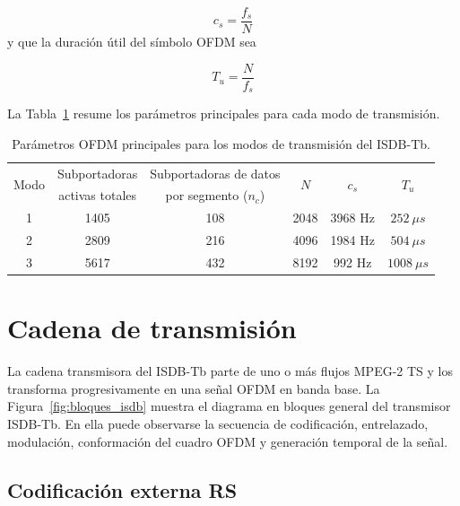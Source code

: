 \begin{equation}
c_s = \frac{f_s}{N}
\end{equation}
y que la duración útil del símbolo OFDM sea

\begin{equation}
T_u = \frac{N}{f_s}
\end{equation}

La Tabla~\ref{tab:isdbtb_modos} resume los parámetros principales para cada modo de transmisión.

{
\begin{table}[H]
\centering
\caption{Parámetros OFDM principales para los modos de transmisión del ISDB-Tb.}
\label{tab:isdbtb_modos}
\renewcommand{\arraystretch}{1.2}
\begin{tabular}{|c|c|c|c|c|c|}
\hline
\multirow{2}{*}{Modo} & Subportadoras & Subportadoras de datos & \multirow{2}{*}{$N$} & \multirow{2}{*}{$c_s$} & \multirow{2}{*}{$T_u$} \\
& activas totales & por segmento ($n_c$) & & & \\
\hline
1 & 1405 & 108 & 2048 & 3968 Hz & $252\ \mu s$ \\\hline
2 & 2809 & 216 & 4096 & 1984 Hz & $504\ \mu s$ \\\hline
3 & 5617 & 432 & 8192 & 992 Hz & $1008\ \mu s$ \\
\hline
\end{tabular}
\end{table}

}
\section{Cadena de transmisión}


La cadena transmisora del ISDB-Tb parte de uno o más flujos MPEG-2 TS y los transforma progresivamente en una señal OFDM en banda base. La Figura~\ref{fig:bloques_isdb} muestra el diagrama en bloques general del transmisor ISDB-Tb. En ella puede observarse la secuencia de codificación, entrelazado, modulación, conformación del cuadro OFDM y generación temporal de la señal.


\subsection{Codificación externa RS}

